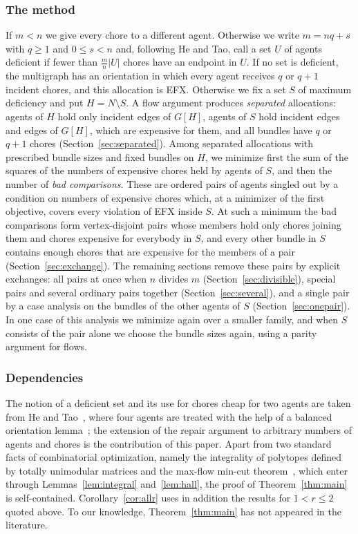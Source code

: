 \documentclass{amsart}
\numberwithin{equation}{section}
\theoremstyle{definition}
\theoremstyle{remark}
\begin{document}
\subsubsection*{The method}
If $m<n$ we give every chore to a different agent. Otherwise we write $m=nq+s$ with $q\ge1$ and $0\le s<n$ and, following He and Tao, call a set $U$ of agents deficient if fewer than $\frac mn|U|$ chores have an endpoint in $U$. If no set is deficient, the multigraph has an orientation in which every agent receives $q$ or $q+1$ incident chores, and this allocation is EFX. Otherwise we fix a set $S$ of maximum deficiency and put $H=N\setminus S$. A flow argument produces \emph{separated} allocations: agents of $H$ hold only incident edges of $G[H]$, agents of $S$ hold incident edges and edges of $G[H]$, which are expensive for them, and all bundles have $q$ or $q+1$ chores (Section~\ref{sec:separated}). Among separated allocations with prescribed bundle sizes and fixed bundles on $H$, we minimize first the sum of the squares of the numbers of expensive chores held by agents of $S$, and then the number of \emph{bad comparisons}. These are ordered pairs of agents singled out by a condition on numbers of expensive chores which, at a minimizer of the first objective, covers every violation of EFX inside $S$. At such a minimum the bad comparisons form vertex-disjoint pairs whose members hold only chores joining them and chores expensive for everybody in $S$, and every other bundle in $S$ contains enough chores that are expensive for the members of a pair (Section~\ref{sec:exchange}). The remaining sections remove these pairs by explicit exchanges: all pairs at once when $n$ divides $m$ (Section~\ref{sec:divisible}), special pairs and several ordinary pairs together (Section~\ref{sec:several}), and a single pair by a case analysis on the bundles of the other agents of $S$ (Section~\ref{sec:onepair}). In one case of this analysis we minimize again over a smaller family, and when $S$ consists of the pair alone we choose the bundle sizes again, using a parity argument for flows.

\subsubsection*{Dependencies}
The notion of a deficient set and its use for chores cheap for two agents are taken from He and Tao~\cite[Section~5.4]{HT26}, where four agents are treated with the help of a balanced orientation lemma~\cite[Lemma~4]{HT26}; the extension of the repair argument to arbitrary numbers of agents and chores is the contribution of this paper. Apart from two standard facts of combinatorial optimization, namely the integrality of polytopes defined by totally unimodular matrices and the max-flow min-cut theorem~\cite{Sch03}, which enter through Lemmas~\ref{lem:integral} and~\ref{lem:hall}, the proof of Theorem~\ref{thm:main} is self-contained. Corollary~\ref{cor:allr} uses in addition the results for $1<r\le2$ quoted above. To our knowledge, Theorem~\ref{thm:main} has not appeared in the literature.
\end{document}
